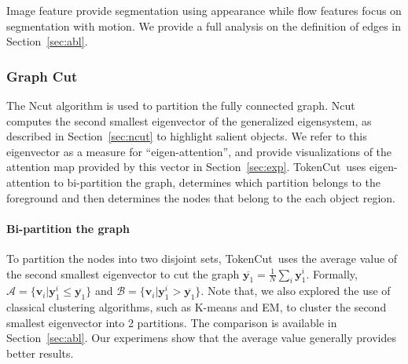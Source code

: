 \documentclass[twocolumn]{article}
\newcommand{\name} {TokenCut}
\newcommand{\feat}{\mathbf{v}}
\newcommand{\indicatory}{\mathbf{y}}
\newcommand{\nbnode}{N}
\begin{document}
Image feature provide segmentation using appearance while flow features focus on segmentation with motion. We provide a full analysis on the definition of edges in Section~\ref{sec:abl}. 








\subsubsection{Graph Cut}
 
The Ncut algorithm is used to partition the fully connected graph. Ncut computes the  second smallest eigenvector of the generalized eigensystem, as described in Section~\ref{sec:ncut} to highlight salient objects. 
We refer to this eigenvector as a measure for ``eigen-attention'', 
and provide visualizations of the attention map provided by this vector in Section~\ref{sec:exp}. 
\name~uses eigen-attention  to bi-partition the graph,  determines which partition belongs to the foreground and then determines the nodes that belong to the each object region.



\paragraph*{Bi-partition the graph}
To partition the nodes into two disjoint sets, \name~uses the average value of the second smallest eigenvector to cut the graph $\overline{\indicatory_1} =  \frac{1}{\nbnode} \sum_{i} \indicatory^i_1$. Formally, $\mathcal{A} = \{\feat_i | \indicatory^i_1 \le \overline{\indicatory_1} \}$ and $\mathcal{B} = \{\feat_i | \indicatory^i_1 > \overline{\indicatory_1} \}$. Note that, we also explored the use of classical clustering algorithms, such as K-means and EM, to cluster the second smallest eigenvector into 2 partitions. The comparison is available in Section~\ref{sec:abl}. Our experimens show that the average value generally provides better results.
\end{document}
